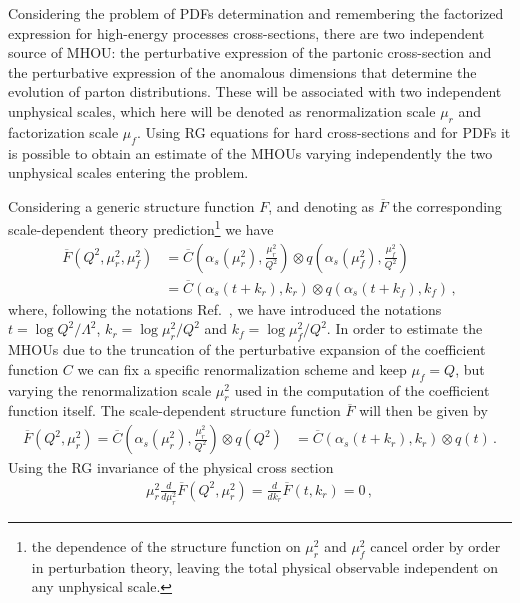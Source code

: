 %
Considering the problem of PDFs determination and remembering the factorized expression
for high-energy processes cross-sections, there are two independent source of MHOU: the 
perturbative expression of the partonic cross-section and the perturbative expression of the 
anomalous dimensions that determine the evolution of parton distributions.
These will be associated with two independent unphysical scales, which here will be denoted as renormalization scale
$\mu_r$ and factorization scale $\mu_f$.
Using RG equations for hard cross-sections and for PDFs it is possible to obtain an estimate of the MHOUs 
varying independently the two unphysical scales entering the problem.

Considering a generic structure function $F$, 
and denoting as $\overline{F}$ the corresponding scale-dependent theory prediction\footnote{the dependence of the structure 
function on $\mu_r^2$ and $\mu_f^2$ cancel order by order in 
perturbation theory, leaving the total physical observable independent on any unphysical scale.}
we have 
\begin{align}
\label{eq:scale_var_F}
    \overline{F}\left(Q^2,\mu_r^2, \mu_f^2\right) &= 
    \overline{C}\left(\alpha_s\left(\mu_r^2\right),\frac{\mu_r^2}{Q^2}\right)\otimes 
    q\left(\alpha_s\left(\mu_f^2\right),\frac{\mu_f^2}{Q^2}\right) \nonumber\\
    &=\overline{C}\left(\alpha_s\left(t+k_r\right),k_r\right)\otimes q\left(\alpha_s\left(t+k_f\right),k_f\right)\,,
\end{align}
where, following the notations Ref.~\cite{AbdulKhalek:2019ihb}, we have introduced the notations
$t = \log Q^2/\Lambda^2$, $k_r = \log \mu_r^2/Q^2$ and $k_f = \log \mu_f^2/Q^2$.
In order to estimate the MHOUs due to the truncation of the perturbative expansion of the coefficient function 
$C$ we can fix a specific renormalization scheme and keep $\mu_f = Q$, but varying
the renormalization scale $\mu_r^2$ used in the computation of the coefficient function itself.
The scale-dependent structure function $\overline{F}$ will then be given by
\begin{align}
    \overline{F}\left(Q^2,\mu_r^2\right) = 
    \overline{C}\left(\alpha_s\left(\mu_r^2\right),\frac{\mu_r^2}{Q^2}\right)\otimes q\left(Q^2\right) 
    &=\overline{C}\left(\alpha_s\left(t+k_r\right),k_r\right)\otimes q\left(t\right)\,.
\end{align}
Using the RG invariance of the physical cross section
\begin{align}
    \label{eq:RG_invariance}
    \mu_r^2\frac{d}{d\mu_r^2}\overline{F}\left(Q^2,\mu_r^2\right) = \frac{d}{dk_r}\overline{F}\left(t,k_r\right)=0\,,
\end{align}
